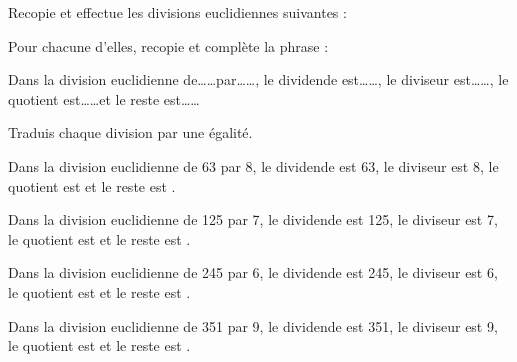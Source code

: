 \begin{myenumerate}
\item Recopie et effectue les divisions euclidiennes suivantes :\\
\hfill
{}\hfill
{}\hfill
{}
\item Pour chacune d'elles, recopie et complète la phrase :
\par
\begin{cursive}
Dans la division euclidienne de\ldots\ldots par\ldots\ldots, le
dividende est\ldots\ldots, le diviseur est\ldots\ldots, le quotient
est\ldots\ldots et le reste est\ldots\ldots
\end{cursive}
\item Traduis chaque division par une égalité.
\end{myenumerate}
\begin{myenumerate}
  \item\subitem{}\par
{}\hfill{}\hfill{}\hfill{}
\item\subitem{}\par
\begin{cursive}
Dans la division euclidienne de 63 par 8, le dividende est 63, le diviseur est 8, le quotient est  et le reste est .
\end{cursive}
\par
\begin{cursive}
Dans la division euclidienne de 125 par 7, le
dividende est 125, le diviseur est 7, le quotient
est  et le reste est .
\end{cursive}
\par
\begin{cursive}
Dans la division euclidienne de 245 par 6, le
dividende est 245, le diviseur est 6, le quotient
est  et le reste est .
\end{cursive}
\par
\begin{cursive}
Dans la division euclidienne de 351 par 9, le
dividende est 351, le diviseur est 9, le quotient
est  et le reste est .
\end{cursive}
\item {}\hfill{}\hfill{}\hfill{}
\end{myenumerate}
